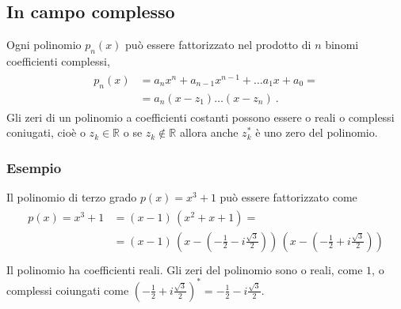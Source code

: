 \documentclass[letterpaper,10pt,italian]{jupyterBook}
\begin{document}
\subsection{In campo complesso}
\label{\detokenize{ch/precalculus/polynomials:in-campo-complesso}}\label{\detokenize{ch/precalculus/polynomials:math-hs-precalculus-polynomials-alg-fund-thm-real-coeffs}}
\sphinxAtStartPar
Ogni polinomio \(p_n(x)\)  può essere fattorizzato nel prodotto di \(n\) binomi coefficienti complessi,
\begin{equation*}
\begin{split}\begin{aligned}
  p_n(x) & = a_n x^n + a_{n-1} x^{n-1} + \dots a_1 x + a_0 = \\
         & = a_n ( x - z_1 ) \dots ( x - z_n ) \ .
\end{aligned}\end{split}
\end{equation*}
\sphinxAtStartPar
Gli zeri di un polinomio a coefficienti costanti possono essere o reali o complessi coniugati, cioè o \(z_k \in \mathbb{R}\) o se \(z_k \notin \mathbb{R}\) allora anche \(z_k^*\) è uno zero del polinomio.


\subsubsection{Esempio}
\label{\detokenize{ch/precalculus/polynomials:esempio}}
\sphinxAtStartPar
Il polinomio di terzo grado \(p(x) = x^3 + 1\) può essere fattorizzato come
\begin{equation*}
\begin{split}\begin{aligned}
  p(x) = x^3 + 1
     & = (x - 1) \, ( x^2 + x + 1 ) = \\
     & = (x - 1) \, \left( x - \left( -\frac{1}{2} - i \frac{\sqrt{3}}{2} \right) \right) \, \left( x - \left( -\frac{1}{2} + i \frac{\sqrt{3}}{2} \right) \right) \\
\end{aligned}\end{split}
\end{equation*}
\sphinxAtStartPar
Il polinomio ha coefficienti reali. Gli zeri del polinomio sono o reali, come  \(1\), o complessi coiungati come \(\left( -\frac{1}{2} + i \frac{\sqrt{3}}{2} \right)^* = -\frac{1}{2} - i \frac{\sqrt{3}}{2}\).
\end{document}
